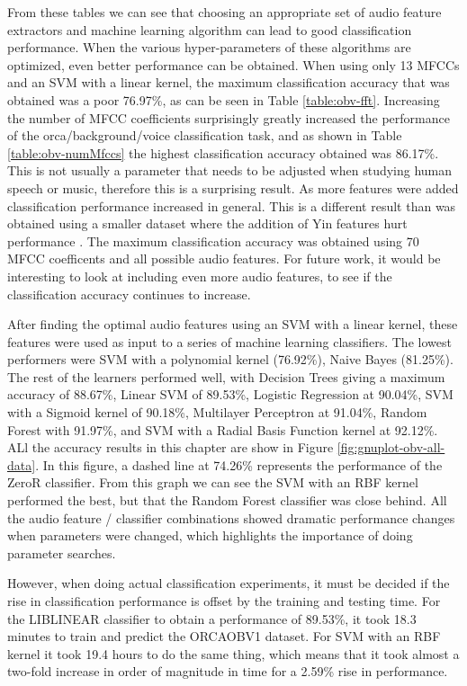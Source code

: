 \documentclass[12pt,oneside]{book}
\begin{document}
From these tables we can see that choosing an appropriate set of audio
feature extractors and machine learning algorithm can lead to good
classification performance.  When the various hyper-parameters of
these algorithms are optimized, even better performance can be
obtained.  When using only 13 MFCCs and an SVM with a linear kernel,
the maximum classification accuracy that was obtained was a poor
76.97\%, as can be seen in Table \ref{table:obv-fft}.  Increasing the
number of MFCC coefficients surprisingly greatly increased the
performance of the orca/background/voice classification task, and as
shown in Table \ref{table:obv-numMfccs} the highest classification
accuracy obtained was 86.17\%.  This is not usually a parameter that
needs to be adjusted when studying human speech or music, therefore this is a
surprising result.  As more features were added classification
performance increased in general.  This is a different result than was
obtained using a smaller dataset where the addition of Yin features
hurt performance \cite{ness2008chants}.  The maximum classification
accuracy was obtained using 70 MFCC coefficents and all possible audio
features.  For future work, it would be interesting to look at
including even more audio features, to see if the classification
accuracy continues to increase.

After finding the optimal audio features using an SVM with a linear
kernel, these features were used as input to a series of machine
learning classifiers.  The lowest performers were SVM with a
polynomial kernel (76.92\%), Naive Bayes (81.25\%).  The rest of the
learners performed well, with Decision Trees giving a maximum accuracy
of 88.67\%, Linear SVM of 89.53\%, Logistic Regression at 90.04\%, SVM
with a Sigmoid kernel of 90.18\%, Multilayer Perceptron at 91.04\%,
Random Forest with 91.97\%, and SVM with a Radial Basis Function
kernel at 92.12\%.  ALl the accuracy results in this chapter are
show in Figure \ref{fig:gnuplot-obv-all-data}.  In this figure, a
dashed line at 74.26\% represents the performance of the ZeroR
classifier.  From this graph we can see the SVM with an RBF kernel
performed the best, but that the Random Forest classifier was close
behind.  All the audio feature / classifier combinations showed
dramatic performance changes when parameters were changed, which
highlights the importance of doing parameter searches.

However, when doing actual classification experiments, it must be
decided if the rise in classification performance is offset by the
training and testing time.  For the LIBLINEAR classifier to obtain a
performance of 89.53\%, it took 18.3 minutes to train and predict the
ORCAOBV1 dataset.  For SVM with an RBF kernel it took 19.4 hours to do
the same thing, which means that it took almost a two-fold increase in
order of magnitude in time for a 2.59\% rise in performance.
\end{document}
